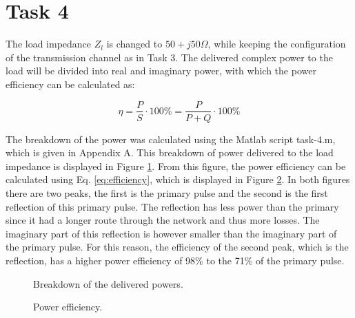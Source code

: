 \documentclass[final]{scrreprt} %
\begin{document}
\section{Task 4}
The load impedance $Z_l$ is changed to $50 + j50 \Omega$, while keeping the configuration of the transmission channel as in Task 3. The delivered complex power to the load will be divided into real and imaginary power, with which the power efficiency can be calculated as:

\begin{equation}
	\eta = \frac{P}{S} \cdot 100\% = \frac{P}{P + Q} \cdot 100\%
	\label{eq:efficiency}
\end{equation}

The breakdown of the power was calculated using the Matlab script task-4.m, which is given in Appendix A. This breakdown of power delivered to the load impedance is displayed in Figure \ref{fig:breakdown}. From this figure, the power efficiency can be calculated using Eq. \ref{eq:efficiency}, which is displayed in Figure \ref{fig:efficiency}. In both figures there are two peaks, the first is the primary pulse and the second is the first reflection of this primary pulse. The reflection has less power than the primary since it had a longer route through the network and thus more losses. The imaginary part of this reflection is however smaller than the imaginary part of the primary pulse. For this reason, the efficiency of the second peak, which is the reflection, has a higher power efficiency of 98\% to the 71\% of the primary pulse.

\begin{figure}[H]
	\centering
	\setlength\figureheight{4cm}
    	\setlength{}
	
	\label{fig:breakdown}
	\caption{Breakdown of the delivered powers.}
\end{figure}

\begin{figure}[H]
	\centering
	\setlength\figureheight{4cm}
    	\setlength{}
	
	\label{fig:efficiency}
	\caption{Power efficiency.}
\end{figure}
\end{document}
